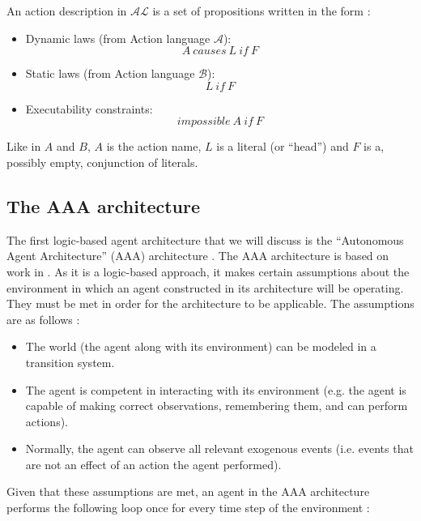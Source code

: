 An action description in $ \mathcal{AL} $ is a set of propositions written in the form \cite{baral_reasoning_2000, blount_architecture_2013}:

\begin{itemize}
    \item Dynamic laws (from Action language $ \mathcal{A} $):
        $$
        A\ causes\ L\ if\ F
        $$

    \item Static laws (from Action language $ \mathcal{B} $):
        $$
        L\ if\ F
        $$

    \item Executability constraints:
        $$
        impossible\ A\ if\ F
        $$
\end{itemize}

Like in $A$ and $B$, $A$ is the action name, $L$ is a literal (or ``head'') and $F$ is a, possibly empty, conjunction of literals.

\subsection{The AAA architecture}
\label{subsec:aaa_architecture}

The first logic-based agent architecture that we will discuss is the ``Autonomous Agent Architecture'' (AAA) architecture \cite{balduccini_aaa_2008}.
The AAA architecture is based on work in \cite{baral_reasoning_2000,balduccini_diagnostic_2003, balduccini_answer_2006,balduccini_learning_2007}.
As it is a logic-based approach, it makes certain assumptions about the environment in which an agent constructed in its architecture will be operating.
They must be met in order for the architecture to be applicable.
The assumptions are as follows \cite{balduccini_aaa_2008}:

\begin{itemize}
    \item The world (the agent along with its environment) can be modeled in a transition system.
    \item The agent is competent in interacting with its environment (e.g. the agent is capable of making correct observations, remembering them, and can perform actions).
    \item Normally, the agent can observe all relevant exogenous events (i.e. events that are not an effect of an action the agent performed).
\end{itemize}

Given that these assumptions are met, an agent in the AAA architecture performs the following loop once for every time step of the environment \cite{balduccini_aaa_2008}:

